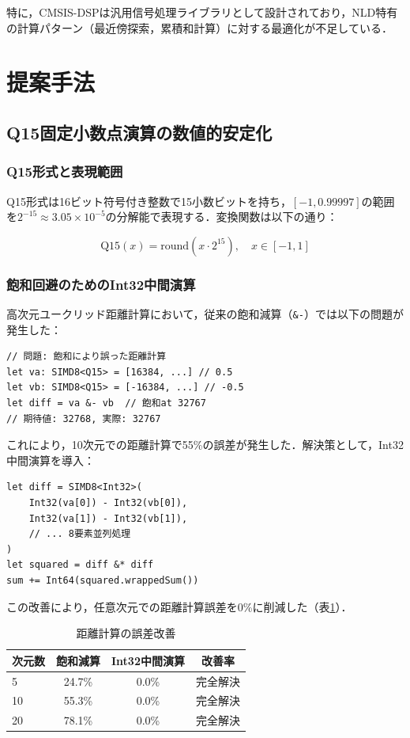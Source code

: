 \documentclass[paper]{ieice}
\begin{document}
特に，CMSIS-DSPは汎用信号処理ライブラリとして設計されており，NLD特有の計算パターン（最近傍探索，累積和計算）に対する最適化が不足している．


\section{提案手法}

\subsection{Q15固定小数点演算の数値的安定化}

\subsubsection{Q15形式と表現範囲}
Q15形式は16ビット符号付き整数で15小数ビットを持ち，$[-1, 0.99997]$の範囲を$2^{-15} \approx 3.05 \times 10^{-5}$の分解能で表現する．変換関数は以下の通り：

\begin{equation}
\text{Q15}(x) = \text{round}(x \cdot 2^{15}), \quad x \in [-1, 1]
\end{equation}

\subsubsection{飽和回避のためのInt32中間演算}
高次元ユークリッド距離計算において，従来の飽和減算（\verb|&-|）では以下の問題が発生した：

\begin{lstlisting}[caption=飽和問題の発生例]
// 問題: 飽和により誤った距離計算
let va: SIMD8<Q15> = [16384, ...] // 0.5
let vb: SIMD8<Q15> = [-16384, ...] // -0.5
let diff = va &- vb  // 飽和at 32767
// 期待値: 32768, 実際: 32767
\end{lstlisting}

これにより，10次元での距離計算で55\%の誤差が発生した．解決策として，Int32中間演算を導入：

\begin{lstlisting}[caption=Int32中間演算による解決]
let diff = SIMD8<Int32>(
    Int32(va[0]) - Int32(vb[0]),
    Int32(va[1]) - Int32(vb[1]),
    // ... 8要素並列処理
)
let squared = diff &* diff
sum += Int64(squared.wrappedSum())
\end{lstlisting}

この改善により，任意次元での距離計算誤差を0\%に削減した（表\ref{tab:distance_error}）．

\begin{table}[t]
\caption{距離計算の誤差改善}
\label{tab:distance_error}
\centering
\begin{tabular}{lccc}
\toprule
次元数 & 飽和減算 & Int32中間演算 & 改善率 \\
\midrule
5 & 24.7\% & 0.0\% & 完全解決 \\
10 & 55.3\% & 0.0\% & 完全解決 \\
20 & 78.1\% & 0.0\% & 完全解決 \\
\bottomrule
\end{tabular}
\end{table}
\end{document}
